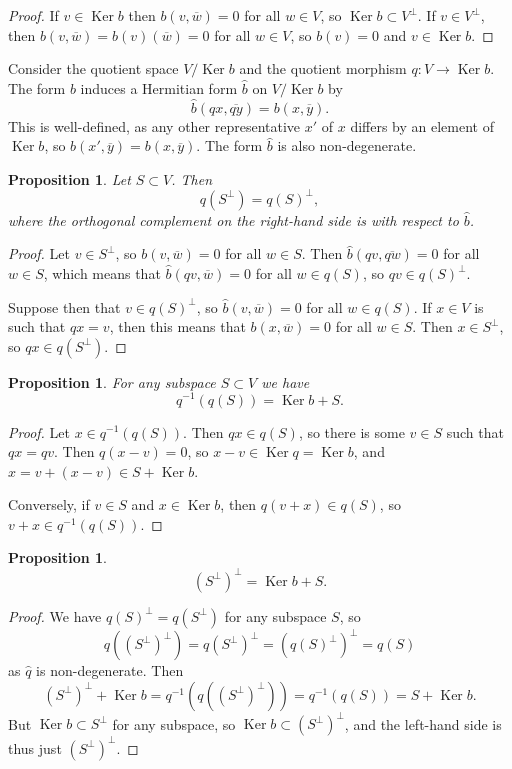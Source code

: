 \documentclass[10pt,a4paper]{article}
\newtheorem{prop}[theo]{Proposition}
\newtheorem*{proof}{Proof}
\def\ov#1{\overline{#1}}
\DeclareMathOperator{\Ker}{Ker}
\begin{document}
\begin{proof}
If $v \in \Ker b$ then $b(v, \ov w) = 0$ for all $w \in V$, so $\Ker b \subset V^\perp$. If $v \in V^\perp$, then $b(v, \ov w) = b(v)(\ov w) = 0$ for all $w \in V$, so $b(v) = 0$ and $v \in \Ker b$.
\end{proof}


Consider the quotient space $V / \Ker b$ and the quotient morphism $q : V \to \Ker b$. The form $b$ induces a Hermitian form $\hat b$ on $V / \Ker b$ by
\[
\hat b(q x, \ov {qy})
= b(x, \ov y).
\]
This is well-defined, as any other representative $x'$ of $x$ differs by an element of $\Ker b$, so $b(x', \ov y) = b(x, \ov y)$. The form $\hat b$ is also non-degenerate.

\begin{prop}
Let $S \subset V$. Then
\[
q(S^\perp) = q(S)^\perp,
\]
where the orthogonal complement on the right-hand side is with respect to $\hat b$.
\end{prop}

\begin{proof}
Let $v \in S^\perp$, so $b(v, \ov w) = 0$ for all $w \in S$. Then $\hat b(qv, \ov{qw}) = 0$ for all $w \in S$, which means that $\hat b(qv, \ov w) = 0$ for all $w \in q(S)$, so $qv \in q(S)^\perp$.

Suppose then that $v \in q(S)^\perp$, so $\hat b(v, \ov w) = 0$ for all $w \in q(S)$. If $x \in V$ is such that $qx = v$, then this means that $b(x, \ov w) = 0$ for all $w \in S$. Then $x \in S^\perp$, so $qx \in q(S^\perp)$.
\end{proof}


\begin{prop}
For any subspace $S \subset V$ we have
\[
q^{-1}(q(S)) = \Ker b + S.
\]
\end{prop}

\begin{proof}
Let $x \in q^{-1}(q(S))$. Then $qx \in q(S)$, so there is some $v \in S$ such that $qx = qv$. Then $q(x - v) = 0$, so $x - v \in \Ker q = \Ker b$, and $x = v + (x - v) \in S + \Ker b$.

Conversely, if $v \in S$ and $x \in \Ker b$, then $q(v + x) \in q(S)$, so $v + x \in q^{-1}(q(S))$.
\end{proof}

\begin{prop}
\[
(S^\perp)^\perp
= \Ker b + S.
\]
\end{prop}

\begin{proof}
We have $q(S)^\perp = q(S^\perp)$ for any subspace $S$, so
\[
q((S^\perp)^\perp)
= q(S^\perp)^\perp
= (q(S)^\perp)^\perp
= q(S)
\]
as $\hat q$ is non-degenerate. Then
\[
(S^\perp)^\perp + \Ker b
= q^{-1}(q((S^\perp)^\perp))
= q^{-1}(q(S))
= S + \Ker b.
\]
But $\Ker b \subset S^\perp$ for any subspace, so $\Ker b \subset (S^\perp)^\perp$, and the left-hand side is thus just $(S^\perp)^\perp$.
\end{proof}
\end{document}
